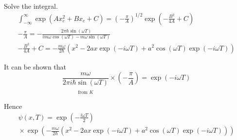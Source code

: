 \documentclass[12pt]{article}
\begin{document}
Solve the integral.
\begin{gather*}
\int_{-\infty}^\infty\exp(Ax_c^2+Bx_c+C)
=\left(-\frac{\pi}{A}\right)^{1/2}
\exp\left(-\frac{B^2}{4A}+C\right)
\\
-\frac{\pi}{A}
=-\frac{2\pi\hbar\sin(\omega T)}{im\omega\cos(\omega T)-m\omega\sin(\omega T)}
\tag{4}
\\
-\frac{B^2}{4A}+C
=-\frac{m\omega}{2\hbar}
\left(x^2-2ax\exp(-i\omega T)+a^2\cos(\omega T)\exp(-i\omega T)\right)
\tag{5}
\end{gather*}

It can be shown that
\begin{equation*}
\underset{\substack{\\[1ex]\text{from $K$}}}
{\frac{m\omega}{2\pi i\hbar\sin(\omega T)}}
\times
\left(-\frac{\pi}{A}\right)
=\exp(-i\omega T)
\tag{6}
\end{equation*}

Hence
\begin{multline*}
\psi(x,T)=\exp\left(-\frac{i\omega T}{2}\right)
\\
{}\times\exp\left(
-\frac{m\omega}{2\hbar}
\left(x^2-2ax\exp(-i\omega T)+a^2\cos(\omega T)\exp(-i\omega T)\right)
\right)
\end{multline*}
\end{document}
